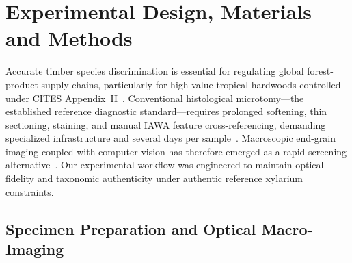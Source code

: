 \documentclass[a4paper,fleqn,12pt]{cas-sc}
\begin{document}
\section{Experimental Design, Materials and Methods}
\label{sec:methods}

Accurate timber species discrimination is essential for regulating global forest-product supply chains, particularly for high-value tropical hardwoods controlled under CITES Appendix~II~\cite{dormontt2015,cites}. Conventional histological microtomy---the established reference diagnostic standard---requires prolonged softening, thin sectioning, staining, and manual IAWA feature cross-referencing, demanding specialized infrastructure and several days per sample~\cite{dormontt2015,iawa1989,wiedenhoeft2011}. Macroscopic end-grain imaging coupled with computer vision has therefore emerged as a rapid screening alternative~\cite{woodreview,ravindran2020,ravindran2022}. Our experimental workflow was engineered to maintain optical fidelity and taxonomic authenticity under authentic reference xylarium constraints.

\subsection{Specimen Preparation and Optical Macro-Imaging}
\end{document}
